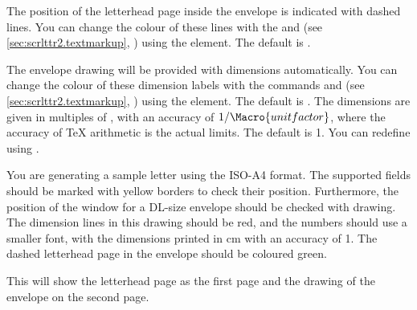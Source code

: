 %
The position of the letterhead page inside the envelope is indicated with
dashed lines. You can change the colour of these lines with the
 and 
(see \autoref{sec:scrlttr2.textmarkup},
) using the
 element. The default is
.%
%

%
The envelope drawing will be provided with dimensions automatically. You can
change the colour of these dimension labels with the commands
 and 
(see \autoref{sec:scrlttr2.textmarkup},
) using the
 element. The default is
. The dimensions are given in multiples of
, with an accuracy of $1/\Macro{unitfactor}$, where the
accuracy of \TeX{} arithmetic is the actual limits. The default is 1. You can
redefine  using .%
%

\begin{Example}
  You are generating a sample letter using the ISO-A4 format. The supported
  fields should be marked with yellow borders to check their position.
  Furthermore, the position of the window for a DL-size envelope should be
  checked with drawing. The dimension lines in this drawing should be red, and
  the numbers should use a smaller font, with the dimensions printed in cm
  with an accuracy of 1. The dashed letterhead page in the envelope
  should be coloured green.
  This will show the letterhead page as the first page and the drawing of the
  envelope on the second page.
\end{Example}

